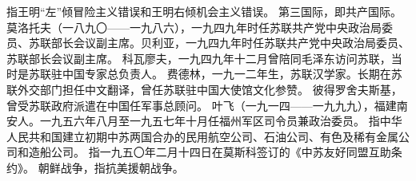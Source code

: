 \begin{maonote}
指王明“左”倾冒险主义错误和王明右倾机会主义错误。
第三国际，即共产国际。
莫洛托夫（一八九〇——一九八六），一九四九年时任苏联共产党中央政治局委员、苏联部长会议副主席。贝利亚，一九四九年时任苏联共产党中央政治局委员、苏联部长会议副主席。
科瓦廖夫，一九四九年十二月曾陪同毛泽东访问苏联，当时是苏联驻中国专家总负责人。
费德林，一九一二年生，苏联汉学家。长期在苏联外交部门担任中文翻译，曾任苏联驻中国大使馆文化参赞。
彼得罗舍夫斯基，曾受苏联政府派遣在中国任军事总顾问。
叶飞（一九一四——一九九九），福建南安人。一九五六年八月至一九五七年十月任福州军区司令员兼政治委员。
指中华人民共和国建立初期中苏两国合办的民用航空公司、石油公司、有色及稀有金属公司和造船公司。
指一九五〇年二月十四日在莫斯科签订的《中苏友好同盟互助条约》。
朝鲜战争，指抗美援朝战争。
\end{maonote}
